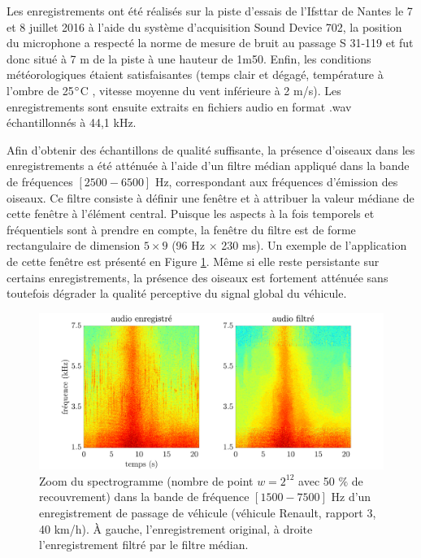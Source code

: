 

Les enregistrements ont été réalisés sur la piste d'essais de l'Ifsttar de Nantes le 7 et 8 juillet 2016 à l'aide du système d'acquisition Sound Device 702, la position du microphone a respecté la norme de mesure de bruit au passage S 31-119 et fut donc situé à 7 m de la piste à une hauteur de 1m50. Enfin, les conditions météorologiques étaient satisfaisantes (temps clair et dégagé, température à l'ombre de 25$\degree$C , vitesse moyenne du vent inférieure à 2 m/s). Les enregistrements sont ensuite extraits en fichiers audio en format .wav échantillonnés à 44,1 kHz.

Afin d'obtenir des échantillons de qualité suffisante, la présence d'oiseaux dans les enregistrements a été atténuée à l'aide d'un filtre médian \cite{fitzgerald_harmonic/percussive_2010} appliqué dans la bande de fréquences $\left[2500 - 6500\right]$ Hz, correspondant aux fréquences d'émission des oiseaux. Ce filtre consiste à définir une fenêtre et à attribuer la valeur médiane de cette fenêtre à l'élément central. Puisque les aspects à la fois temporels et fréquentiels sont à prendre en compte, la fenêtre du filtre est de forme rectangulaire de dimension $5 \times 9$ (96 Hz $\times$ 230 ms). Un exemple de l'application de cette fenêtre est présenté en Figure \ref{fig:filtre_median}. Même si elle reste persistante sur certains enregistrements, la présence des oiseaux est fortement atténuée sans toutefois dégrader la qualité perceptive du signal global du véhicule.

\begin{figure}[t]
\centering
\includegraphics[width=.9\textwidth]{./figures/autres/filtrageMedian_VL1_R3_40_FR.pdf}
\caption{Zoom du spectrogramme (nombre de point $w = 2^{12}$ avec 50 $\%$ de recouvrement) dans la bande de fréquence $\left[1500-7500 \right]$ Hz d'un enregistrement de passage de véhicule (véhicule Renault, rapport 3, 40 km/h). \`A gauche, l'enregistrement original, à droite l'enregistrement filtré par le filtre médian.}
\label{fig:filtre_median}
\end{figure}


